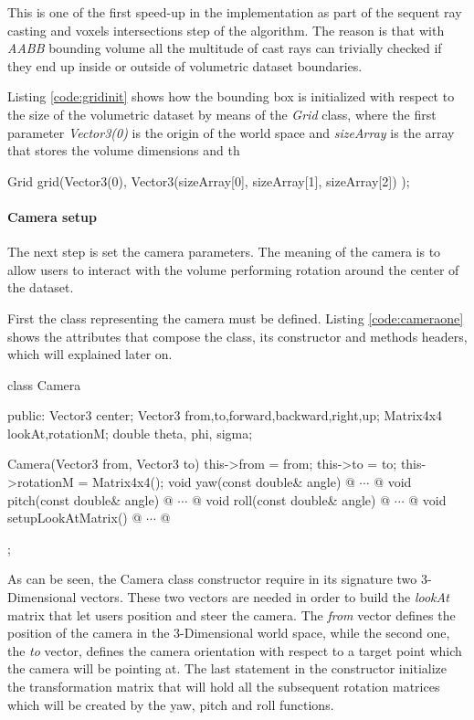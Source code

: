 \documentclass[12pt,a4paper]{extarticle}
\newcommand{\linespace}{\vspace{8pt}}
\begin{document}
This is one of the first speed-up in the implementation as part of the sequent ray casting and voxels intersections step of the algorithm. The reason is that with \textit{AABB} bounding volume all the multitude of cast rays can trivially checked if they end up inside or outside of volumetric dataset boundaries.


Listing \ref{code:gridinit} shows how the bounding box is initialized with respect to the size of the volumetric dataset by means of the \textit{Grid} class, where the first parameter \textit{Vector3(0)} is the origin of the world space and \textit{sizeArray} is the array that stores the volume dimensions and th

\begin{cpp}[caption={Grid class represent the minimum bounding box.},label=code:gridinit]
Grid grid(Vector3(0), 
	Vector3(sizeArray[0], sizeArray[1], sizeArray[2])
	);
\end{cpp}

\paragraph{Camera setup} The next step is set the camera parameters. The meaning of the camera is to allow users to interact with the volume performing rotation around the center of the dataset.

First the class representing the camera must be defined. Listing \ref{code:cameraone} shows the attributes that compose the class, its constructor and methods headers, which will explained later on.

\begin{cpp}[caption={Camera class definition with },label=code:cameraone]
class Camera {
public:
	Vector3 center;
	Vector3 from,to,forward,backward,right,up;
	Matrix4x4 lookAt,rotationM;
	double theta, phi, sigma;

	Camera(Vector3 from, Vector3 to) {
		this->from = from;
		this->to = to;
		this->rotationM = Matrix4x4();
	}
	void yaw(const double& angle) {@ $\cdots$ @}
	void pitch(const double& angle) {@ $\cdots$ @}
	void roll(const double& angle) {@ $\cdots$ @}
	void setupLookAtMatrix() {@ $\cdots$ @}
};
\end{cpp}

As can be seen, the Camera class constructor require in its signature two 3-Dimensional vectors. These two vectors are needed in order to build the \textit{lookAt} matrix that let users position and steer the camera. The \textit{from} vector defines the position of the camera in the 3-Dimensional world space, while the second one, the \textit{to} vector, defines the camera orientation with respect to a target point which the camera will be pointing at.
The last statement in the constructor initialize the transformation matrix that will hold all the subsequent rotation matrices which will be created by the yaw, pitch and roll functions.
\linespace
\end{document}
